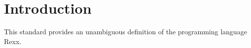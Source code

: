 \chapter{Introduction}\label{introduction}

This standard provides an unambiguous definition of the programming
language Rexx.
